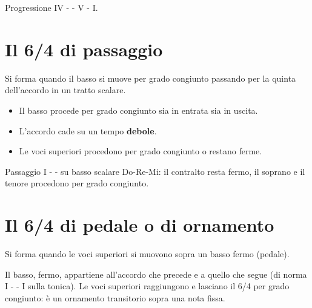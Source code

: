 \begin{esempio}
    Progressione IV -  - V - I.
\end{esempio}

\section{Il 6/4 di passaggio}
\label{sec:64_passaggio}

\begin{definizione}[6/4 di passaggio]
    Si forma quando il basso si muove per grado congiunto passando per la quinta dell'accordo in un tratto scalare.
\end{definizione}

\begin{regola}
    \begin{itemize}
        \item Il basso procede per grado congiunto sia in entrata sia in uscita.
        \item L'accordo cade su un tempo \textbf{debole}.
        \item Le voci superiori procedono per grado congiunto o restano ferme.
    \end{itemize}
\end{regola}

\begin{esempio}[6/4 di passaggio]
    Passaggio I -  -  su basso scalare Do-Re-Mi: il contralto resta fermo, il soprano e il tenore procedono per grado congiunto.
\end{esempio}

\section{Il 6/4 di pedale o di ornamento}
\label{sec:64_pedale}

\begin{definizione}[6/4 di pedale]
    Si forma quando le voci superiori si muovono sopra un basso fermo (pedale).
\end{definizione}

\begin{regola}
    Il basso, fermo, appartiene all'accordo che precede e a quello che segue (di norma I -  - I sulla tonica). Le voci superiori raggiungono e lasciano il 6/4 per grado congiunto: è un ornamento transitorio sopra una nota fissa.
\end{regola}
